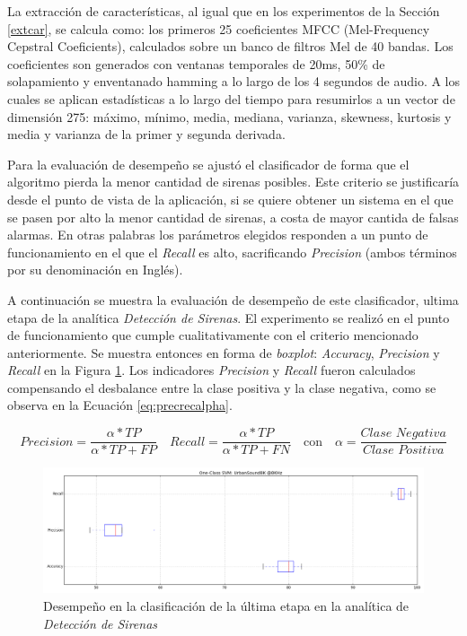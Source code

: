 \documentclass{article}
\begin{document}
\bigskip
La extracción de características, al igual que en los experimentos de la Sección \ref{extcar}, se calcula como: los primeros 25 coeficientes MFCC (Mel-Frequency Cepstral Coeficients), calculados sobre un banco de filtros Mel de 40 bandas. Los coeficientes son generados con ventanas temporales de 20ms, 50\% de solapamiento y enventanado hamming a lo largo de los 4 segundos de audio. A los cuales se aplican estadísticas a lo largo del tiempo para resumirlos a un vector de dimensión 275: máximo, mínimo, media, mediana, varianza, skewness, kurtosis y media y varianza de la primer y segunda derivada.

\bigskip
Para la evaluación de desempeño se ajustó el clasificador de forma que el algoritmo pierda la menor cantidad de sirenas posibles. Este criterio se justificaría desde el punto de vista de la aplicación, si se quiere obtener un sistema en el que se pasen por alto la menor cantidad de sirenas, a costa de mayor cantida de falsas alarmas. En otras palabras los parámetros elegidos responden a un punto de funcionamiento en el que el \textit{Recall} es alto, sacrificando \textit{Precision} (ambos términos por su denominación en Inglés). 

\bigskip A continuación se muestra la evaluación de desempeño de este clasificador, ultima etapa de la analítica \textit{Detección de Sirenas}. El experimento se realizó en el punto de funcionamiento que cumple cualitativamente con el criterio mencionado anteriormente. Se muestra entonces en forma de \textit{boxplot}: \textit{Accuracy}, \textit{Precision} y \textit{Recall} en la Figura \ref{fig:boxplots_one}. Los indicadores \textit{Precision} y \textit{Recall} fueron calculados compensando el desbalance entre la clase positiva y la clase negativa, como se observa en la Ecuación \ref{eq:precrecalpha}.

\begin{equation}
\label{eq:precrecalpha}
\textit{Precision} = \frac{\alpha * TP}{\alpha * TP + FP} \quad
\textit{Recall} = \frac{\alpha * TP}{\alpha * TP + FN} \quad
\textrm{con} \quad \alpha = \frac{\textit{Clase Negativa}}{\textit{Clase Positiva}} 
\end{equation}


 
\begin{figure}[h]
\begin{center}
\includegraphics[width=1\textwidth]{boxplots_one} 
\caption{Desempeño en la clasificación de la última etapa en la analítica de \textit{Detección de Sirenas}}
\label{fig:boxplots_one}
\end{center}
\end{figure}
\end{document}
